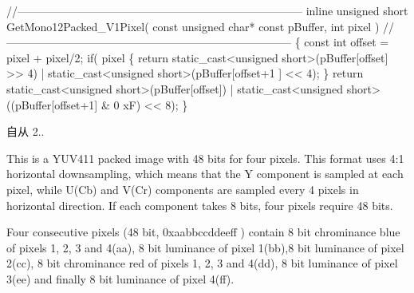 \begin{Desc}
\begin{description}
\begin{DoxyCode}
\textcolor{comment}{//-----------------------------------------------------------------------------}
\textcolor{keyword}{inline} \textcolor{keywordtype}{unsigned} \textcolor{keywordtype}{short} GetMono12Packed\_V1Pixel( \textcolor{keyword}{const} \textcolor{keywordtype}{unsigned} \textcolor{keywordtype}{char}* \textcolor{keyword}{const} pBuffer, \textcolor{keywordtype}{int} pixel )
\textcolor{comment}{//-----------------------------------------------------------------------------}
\{
  \textcolor{keyword}{const} \textcolor{keywordtype}{int} offset = pixel + pixel/2;
  \textcolor{keywordflow}{if}( pixel %
  \{
    \textcolor{keywordflow}{return} \textcolor{keyword}{static\_cast<}\textcolor{keywordtype}{unsigned} \textcolor{keywordtype}{short}\textcolor{keyword}{>}(pBuffer[offset] >> 4) | static\_cast<unsigned short>(pBuffer[offset+1
      ] << 4);
  \}
  \textcolor{keywordflow}{return} \textcolor{keyword}{static\_cast<}\textcolor{keywordtype}{unsigned} \textcolor{keywordtype}{short}\textcolor{keyword}{>}(pBuffer[offset]) | static\_cast<unsigned short>((pBuffer[offset+1] & 0
      xF) << 8);
\}
\end{DoxyCode}


\begin{DoxySince}{自从}
2.. 
\end{DoxySince}
\item[{\em 
\hypertarget{group___common_interface_gga456e8aa76e06bb761f27c52141475985ada117f8b69583b546830c28df3d8aa38}{ibpf\+Y\+U\+V411\+\_\+\+U\+Y\+Y\+V\+Y\+Y\+\_\+\+Packed}\label{group___common_interface_gga456e8aa76e06bb761f27c52141475985ada117f8b69583b546830c28df3d8aa38}
}]This is a Y\+U\+V411 packed image with 48 bits for four pixels. This format uses 4\+:1 horizontal downsampling, which means that the Y component is sampled at each pixel, while U(\+Cb) and V(\+Cr) components are sampled every 4 pixels in horizontal direction. If each component takes 8 bits, four pixels require 48 bits.

Four consecutive pixels (48 bit, 0xaabbccddeeff ) contain 8 bit chrominance blue of pixels 1, 2, 3 and 4(aa), 8 bit luminance of pixel 1(bb),8 bit luminance of pixel 2(cc), 8 bit chrominance red of pixels 1, 2, 3 and 4(dd), 8 bit luminance of pixel 3(ee) and finally 8 bit luminance of pixel 4(ff).


\end{description}
\end{Desc}
